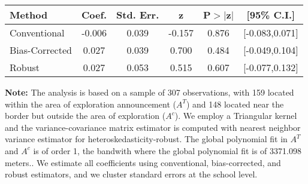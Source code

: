 \begin{table}[htbp]\centering
 \footnotesize 
\begin{tabular}{lccccc}
\hline\hline
Method & Coef. & Std. Err. & z & P$>|$z$|$ & [95\% C.I.] \\ 
\hline \hline  
Conventional & -0.006 & 0.039 & -0.157 & 0.876 & [-0.083,0.071] \\ 
 Bias-Corrected & 0.027 & 0.039 & 0.700 & 0.484 & [-0.049,0.104] \\ 
Robust & 0.027 & 0.053 & 0.515 & 0.607 & [-0.077,0.132] \\ 
  \hline\hline
\end{tabular}
\label{table:rd}
\begin{tablenotes} 
  \justifying \tiny \textbf{Note: }    
   The analysis is based on a sample of 307 observations, with 159 located within the area of exploration announcement ($A^{T}$) and 148 located near the border but outside the area of exploration  ($A^{c}$). 
           We employ a Triangular kernel and the variance-covariance matrix estimator is computed with nearest neighbor variance estimator for heteroskedasticity-robust. The global polynomial fit in  $A^{T}$ and $A^{c}$ is of order 1, the bandwith where the global polynomial fit is of 3371.098 meters.. We estimate all coefficients using conventional, bias-corrected, and robust estimators, and we cluster standard errors at the school level. \end{tablenotes} 
 \end{table} 
